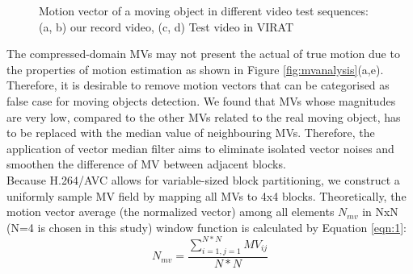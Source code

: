 \begin{figure}
{}
\caption{Motion vector of a moving object in different video test sequences: (a, b) our record video, (c, d) Test video in VIRAT}
\label{fig:mvobject}
\end{figure}
The compressed-domain MVs may not present the actual of true motion due to the properties of motion estimation as shown in Figure \ref{fig:mvanalysis}(a,e). Therefore, it is desirable to remove motion vectors that can be categorised as false case for moving objects detection. We found that MVs  whose magnitudes are very low, compared to the other MVs related to the real moving object, has to be replaced with the median value of neighbouring MVs. Therefore, the application of vector median filter aims to eliminate isolated vector noises and smoothen the difference of MV between adjacent blocks. \\ Because H.264/AVC allows for variable-sized block partitioning, we construct a uniformly sample MV field by mapping all MVs to 4x4 blocks. Theoretically, the motion vector average (the normalized vector) among all elements $N_{mv}$ in NxN (N=4 is chosen in this study) window function is calculated by Equation \ref{eqn:1}: 
\begin{equation}
\label{eqn:1}
N_{mv}= \frac{\sum_{i=1, j=1}^{N*N}MV_{ij}}{N*N}
\end{equation}          
